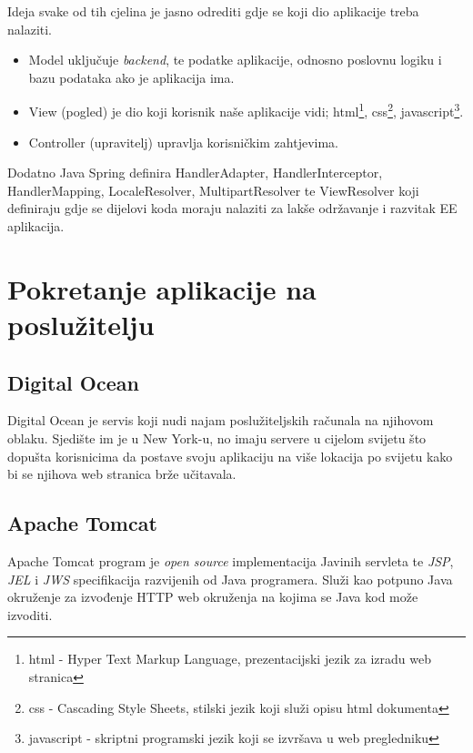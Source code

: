 \documentclass[times, utf8, zavrsni, numeric]{fer}
\begin{document}
\noindent
Ideja svake od tih cjelina je jasno odrediti gdje se koji dio aplikacije treba nalaziti.
\begin{itemize}
				\item Model uključuje \textit{backend}\footnotemark{}, te podatke aplikacije, odnosno poslovnu logiku i bazu podataka ako je aplikacija ima.
	\item View (pogled) je dio koji korisnik naše aplikacije vidi; 
		html\footnote{html - Hyper Text Markup Language, prezentacijski jezik za izradu web stranica}, 
		css\footnote{css - Cascading Style Sheets, stilski jezik koji služi opisu html dokumenta}, 
		javascript\footnote{javascript - skriptni programski jezik koji se izvršava u web pregledniku}.
	\item Controller (upravitelj) upravlja korisničkim zahtjevima.
\end{itemize}
Dodatno Java Spring definira HandlerAdapter, HandlerInterceptor, HandlerMapping, LocaleResolver, MultipartResolver te ViewResolver koji definiraju gdje se dijelovi koda moraju nalaziti za lakše održavanje i razvitak EE\footnotemark{} aplikacija.

\section{Pokretanje aplikacije na poslužitelju}
\subsection{Digital Ocean}
\qquad Digital Ocean je servis koji nudi najam poslužiteljskih računala na njihovom oblaku.
Sjedište im je u New York-u, no imaju servere u cijelom svijetu što dopušta korisnicima da postave svoju aplikaciju na više lokacija po svijetu kako bi se njihova web stranica brže učitavala.
\subsection{Apache Tomcat}
\qquad Apache Tomcat program je \textit{open source} implementacija Javinih servleta te \textit{JSP}\footnotemark{}, \textit{JEL}\footnotemark{} i \textit{JWS}\footnotemark{} specifikacija razvijenih od Java programera.
Služi kao potpuno Java okruženje za izvođenje HTTP web okruženja na kojima se Java kod može izvoditi.
\end{document}
